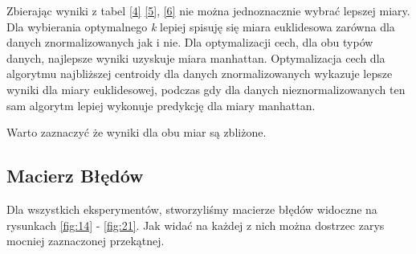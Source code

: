 	Zbierając wyniki z tabel \ref{4} \ref{5}, \ref{6} nie można jednoznacznie wybrać lepszej miary. Dla wybierania optymalnego \textit{k} lepiej spisuję się miara euklidesowa zarówna dla danych znormalizowanych jak i nie. Dla optymalizacji cech, dla obu typów danych, najlepsze wyniki uzyskuje miara manhattan. Optymalizacja cech dla algorytmu najbliższej centroidy dla danych znormalizowanych wykazuje lepsze wyniki dla miary euklidesowej, podczas gdy dla danych nieznormalizowanych ten sam algorytm lepiej wykonuje predykcję dla miary manhattan.
	
	Warto zaznaczyć że wyniki dla obu miar są zbliżone.
	
	\subsection{Macierz Błędów}
	 
	 Dla wszystkich eksperymentów, stworzyliśmy macierze błędów widoczne na rysunkach \ref{fig:14} - \ref{fig:21}. Jak widać na każdej z nich można dostrzec zarys mocniej zaznaczonej przekątnej.
	 